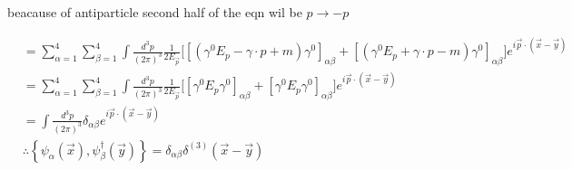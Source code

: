 \documentclass[12pt, letterpaper]{article}
\newcommand*{\1}{\hspace{1pt}}
\begin{document}
beacause of antiparticle second half of the eqn wil be  $ p \to -p$

\begin{align*}
    &= \sum_{\alpha = 1}^{4}\sum_{\beta = 1}^{4} \int \frac{d ^{3} p}{(2 \pi) ^{3}} \frac{1}{{2 E _{\overrightarrow{p}}}} \bigg[ [(\gamma ^{0} E _{p} -\gamma \cdot p + m)\gamma ^{0} ]_{\alpha \beta} + [(\gamma ^{0} E _{p} +\gamma \cdot p - m)\gamma ^{0} ]_{\alpha \beta} \bigg]e ^{i \overrightarrow{p} \cdot (\overrightarrow{x} - \overrightarrow{y})} \\
    &= \sum_{\alpha = 1}^{4}\sum_{\beta = 1}^{4} \int \frac{d ^{3} p}{(2 \pi) ^{3}} \frac{1}{{2 E _{\overrightarrow{p}}}} \bigg[  [ \gamma ^{0} E_{p} \gamma ^{0} ]_{\alpha \beta} + [\gamma ^{0} E _{p} \gamma ^{0} ]_{\alpha \beta} \bigg]e ^{i \overrightarrow{p} \cdot (\overrightarrow{x} - \overrightarrow{y})} \\
    &= \int \frac{d ^{3} p}{(2 \pi) ^{3}} \delta _{\alpha \beta} e ^{i \overrightarrow{p} \cdot (\overrightarrow{x} - \overrightarrow{y})} \\
    &\therefore \left\{ \psi _{\alpha} (\overrightarrow{x}) , \psi ^{\dagger} _{\beta }(\overrightarrow{y})  \right\} = \delta _{\alpha \beta} \delta ^{(3)} (\overrightarrow{x} - \overrightarrow{y})
\end{align*}
    
\end{document}
